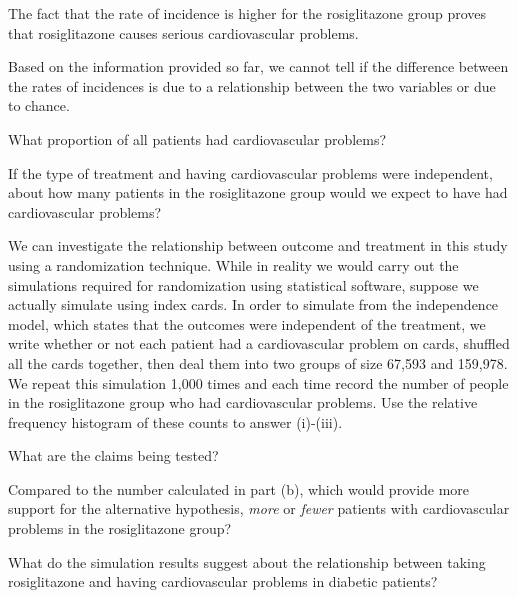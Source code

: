 {\begin{parts}
\begin{subparts}
\item The fact that the rate of incidence is higher for the rosiglitazone group proves that rosiglitazone causes serious cardiovascular problems.
\item Based on the information provided so far, we cannot tell if the difference between the rates of incidences is due to a relationship between the two variables or due to chance.
\end{subparts}
\item What proportion of all patients had cardiovascular problems?
\item If the type of treatment and having cardiovascular problems were independent, about how many patients in the rosiglitazone group would we expect to have had cardiovascular problems?
\item We can investigate the relationship between outcome and treatment in this study using a randomization technique.  While in reality we would carry out the simulations required for randomization using statistical software, suppose we actually simulate using index cards. In order to simulate from the independence model, which states that the outcomes were independent of the treatment, we write whether or not each patient had a cardiovascular problem on cards, shuffled all the cards together, then deal them into two groups of size 67,593 and 159,978. We repeat this simulation 1,000 times and each time record the number of people in the rosiglitazone group who had cardiovascular problems. Use the relative frequency histogram of these counts to answer (i)-(iii).
\end{parts}
\begin{minipage}[c]{0.5\textwidth}
\begin{subparts}
\item What are the claims being tested?
\item Compared to the number calculated in part (b), which would provide more support for the alternative hypothesis,  \textit{more} or \textit{fewer} patients with cardiovascular problems in the rosiglitazone group?
\item What do the simulation results suggest about the relationship between taking rosiglitazone and having cardiovascular problems in diabetic patients?
\end{subparts}
\end{minipage}
\begin{minipage}[c]{0.5\textwidth}

\end{minipage}}
